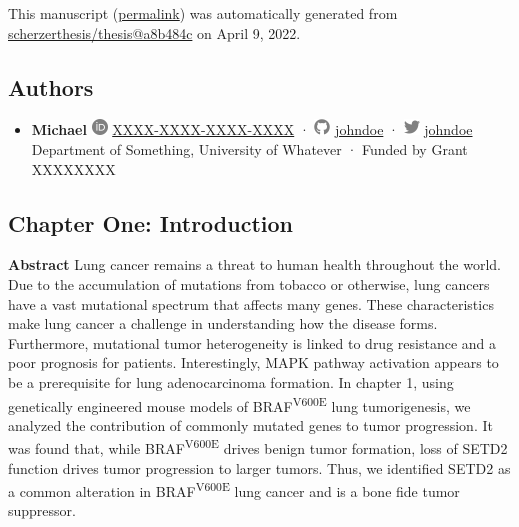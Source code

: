 This manuscript
(\href{https://scherzerthesis.github.io/thesis/v/a8b484c207053ab9518e450fd19345960cfa9065/}{permalink})
was automatically generated
from \href{https://github.com/scherzerthesis/thesis/tree/a8b484c207053ab9518e450fd19345960cfa9065}{scherzerthesis/thesis@a8b484c}
on April 9, 2022.

\hypertarget{authors}{%
\subsection{Authors}\label{authors}}

\begin{itemize}
\tightlist
\item
  \textbf{Michael}
  \includegraphics[width=0.16667in,height=0.16667in]{images/orcid.svg}
  \href{https://orcid.org/XXXX-XXXX-XXXX-XXXX}{XXXX-XXXX-XXXX-XXXX}
  · \includegraphics[width=0.16667in,height=0.16667in]{images/github.svg}
  \href{https://github.com/johndoe}{johndoe}
  · \includegraphics[width=0.16667in,height=0.16667in]{images/twitter.svg}
  \href{https://twitter.com/johndoe}{johndoe}
  Department of Something, University of Whatever
  · Funded by Grant XXXXXXXX
\end{itemize}

\hypertarget{chapter-one-introduction}{%
\subsection{Chapter One: Introduction}\label{chapter-one-introduction}}

\textbf{Abstract}
Lung cancer remains a threat to human health throughout the world. Due to the accumulation of mutations from tobacco or otherwise, lung cancers have a vast mutational spectrum that affects many genes. These characteristics make lung cancer a challenge in understanding how the disease forms. Furthermore, mutational tumor heterogeneity is linked to drug resistance and a poor prognosis for patients. Interestingly, MAPK pathway activation appears to be a prerequisite for lung adenocarcinoma formation. In chapter 1, using genetically engineered mouse models of BRAF\textsuperscript{V600E} lung tumorigenesis, we analyzed the contribution of commonly mutated genes to tumor progression. It was found that, while BRAF\textsuperscript{V600E} drives benign tumor formation, loss of SETD2 function drives tumor progression to larger tumors. Thus, we identified SETD2 as a common alteration in BRAF\textsuperscript{V600E} lung cancer and is a bone fide tumor suppressor.

